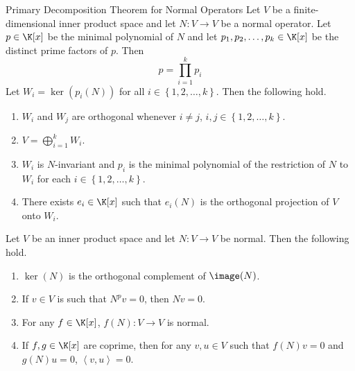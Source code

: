 \documentclass[linearalgebraII]{subfiles}
\begin{document}
    \clearpage
    \begin{theorem}{Primary Decomposition Theorem for Normal Operators}
        Let $V$ be a finite-dimensional inner product space and let $N:V\to V$ be a normal operator. Let $p\in\K[x]$ be the minimal polynomial of $N$ and let $p_1,p_2,\ldots,p_k\in\K[x]$ be the distinct prime factors of $p$. Then
        \begin{equation*}
            p = \prod^{k}_{i=1} p_i
        \end{equation*}
        Let $W_i=\ker\left( p_i(N) \right)$ for all $i\in\left\lbrace 1,2,\ldots,k \right\rbrace$. Then the following hold.
        \begin{enumerate}
            \item $W_i$ and $W_j$ are orthogonal whenever $i\neq j$, $i,j\in\left\lbrace 1,2,\ldots,k \right\rbrace$.
            \item $V = \bigoplus^{k}_{i=1} W_i$.
            \item $W_i$ is $N$-invariant and $p_i$ is the minimal polynomial of the restriction of $N$ to $W_i$ for each $i\in\left\lbrace 1,2,\ldots,k \right\rbrace$.
            \item There exists $e_i\in\K[x]$ such that $e_i(N)$ is the orthogonal projection of $V$ onto $W_i$.
        \end{enumerate}
    \end{theorem}

    \begin{lemma_inside}{}
        Let $V$ be an inner product space and let $N:V\to V$ be normal. Then the following hold.
        \begin{enumerate}
            \item $\ker(N)$ is the orthogonal complement of $\image(N)$.
            \item If $v\in V$ is such that $N^pv = 0$, then $Nv = 0$.
            \item For any $f\in\K[x]$, $f(N):V\to V$ is normal.
            \item If $f,g\in\K[x]$ are coprime, then for any $v,u\in V$ such that $f(N)v=0$ and $g(N)u=0$, $\left\langle v, u\right\rangle =0$.
        \end{enumerate}
    \end{lemma_inside}
\end{document}
